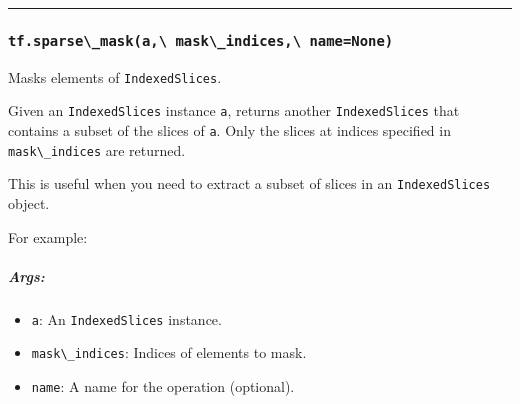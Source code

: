 \begin{center}\rule{0.5\linewidth}{\linethickness}\end{center}

\subsubsection{\texorpdfstring{\lstinline{tf.sparse\_mask(a,\ mask\_indices,\ name=None)}
}{tf.sparse\_mask(a, mask\_indices, name=None) }}\label{tf.sparseux5fmaska-maskux5findices-namenone}

Masks elements of \lstinline{IndexedSlices}.

Given an \lstinline{IndexedSlices} instance \lstinline{a}, returns another
\lstinline{IndexedSlices} that contains a subset of the slices of
\lstinline{a}. Only the slices at indices specified in
\lstinline{mask\_indices} are returned.

This is useful when you need to extract a subset of slices in an
\lstinline{IndexedSlices} object.

For example:

\begin{Shaded}
\begin{Highlighting}[]
\OperatorTok{=>} \NormalTok{[}\NormalTok{, }\NormalTok{, }\NormalTok{, }\NormalTok{]}
\OperatorTok{=>} \NormalTok{[}\NormalTok{, }\NormalTok{]}

\OperatorTok{=} \NormalTok{tf.sparse_mask(a, [}\NormalTok{, }\NormalTok{])}

\OperatorTok{=>} \NormalTok{[}\NormalTok{, }\NormalTok{]}
\OperatorTok{=>} \NormalTok{[}\NormalTok{, }\NormalTok{]}
\end{Highlighting}
\end{Shaded}

\subparagraph{Args: }\label{args-26}

\begin{itemize}
\tightlist
\item
  \lstinline{a}: An \lstinline{IndexedSlices} instance.
\item
  \lstinline{mask\_indices}: Indices of elements to mask.
\item
  \lstinline{name}: A name for the operation (optional).
\end{itemize}

